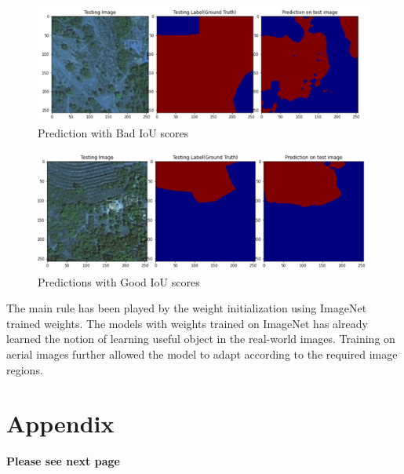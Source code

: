 \documentclass[rnd]{mas_proposal}
\begin{document}
\begin{figure}[htp] 
        \centering
        \includegraphics[width=1.2\textwidth]{images/fig12.png}
        \caption{ Prediction with Bad IoU scores}%
        \label{fig: Prediction with Bad IoU scores}%
\end{figure}

\begin{figure}[htp] 
        \centering
        \includegraphics[width=1.2\textwidth]{images/fig13.png}
        \caption{ Predictions with Good  IoU scores}%
        \label{fig: Predictions with Good  IoU scores}%
\end{figure}



The main rule has been played by the weight initialization using ImageNet trained weights. The models with weights trained on ImageNet has already learned the 
notion of learning useful object in the real-world images. Training on aerial images further allowed the model to adapt according to the required image regions.  

\newpage
 

\newpage
\section{Appendix}


\textbf{Please see next page}



 
\end{document}
